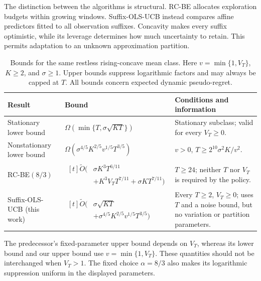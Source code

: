 \documentclass[11pt]{article}
\theoremstyle{remark}
\begin{document}
The distinction between the algorithms is structural. RC-BE allocates
exploration budgets within growing windows. Suffix-OLS-UCB instead compares
affine predictors fitted to all observation suffixes. Concavity makes every
suffix optimistic, while its leverage determines how much uncertainty to
retain. This permits adaptation to an unknown approximation partition.

\begin{table}[t]
\centering
\caption{Bounds for the same restless rising-concave mean class. Here
$v=\min\{1,V_T\}$, $K\ge2$, and $\sigma\ge1$.
Upper bounds suppress logarithmic factors and may always be capped at $T$.
All bounds concern expected dynamic pseudo-regret.}
\label{tab:direct-comparison}
\small
\setlength{\tabcolsep}{4pt}
\renewcommand{\arraystretch}{1.22}
\begin{tabularx}{\textwidth}{@{}P{0.21\textwidth}P{0.44\textwidth}Y@{}}
\toprule
Result & Bound & Conditions and information \\
\midrule
Stationary lower bound
\citep{lattimore2020bandit}
& $\Omega\!\left(\min\{T,\sigma\sqrt{KT}\}\right)$
& Stationary subclass; valid for every $V_T\ge0$. \\
\addlinespace
Nonstationary lower bound
\citep[Theorem~3.3]{migali2025tightening}
& $\Omega\!\left(\sigma^{4/5}K^{2/5}v^{1/5}T^{3/5}\right)$
& $v>0$, $T\ge2^{10}\sigma^2K/v^2$. \\
\addlinespace
RC-BE$(8/3)$
\citep[Theorem~4.4]{migali2025tightening}
& $\begin{aligned}[t]
\widetilde O\bigl(&\sigma K^3T^{6/11}\\
&+K^3V_TT^{7/11}+\sigma KT^{7/11}\bigr)
\end{aligned}$
& $T\ge24$; neither $T$ nor $V_T$ is required by the policy. \\
\addlinespace
Suffix-OLS-UCB
(this work)
& $\begin{aligned}[t]
\widetilde O\bigl(&\sigma\sqrt{KT}\\
&+\sigma^{4/5}K^{2/5}v^{1/5}T^{3/5}\bigr)
\end{aligned}$
& Every $T\ge2$, $V_T\ge0$; uses $T$ and a noise bound, but no variation or partition parameters. \\
\bottomrule
\end{tabularx}
\end{table}

The predecessor's fixed-parameter upper bound depends on $V_T$, whereas
its lower bound and our upper bound use $v=\min\{1,V_T\}$.
These quantities should not be interchanged when $V_T>1$.
The fixed choice $\alpha=8/3$ also makes its logarithmic suppression uniform
in the displayed parameters.
\end{document}
